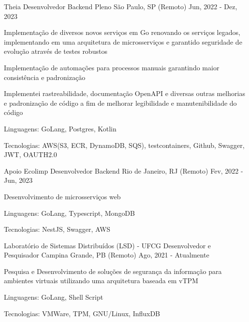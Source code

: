 
\begin{cventries}
  \cventry
  {Theia} %
  {Desenvolvedor Backend Pleno} %
  {São Paulo, SP (Remoto)} %
  {Jun, 2022 - Dez, 2023} %
  {
    \begin{cvitems} %
      \item {Implementação de diversos novos serviços em Go renovando os serviços legados, implementando em uma arquitetura de microsserviços e garantido seguridade de evolução através de testes robustos}
      \item {Implementação de automações para processos manuais garantindo maior consistência e padronização}
      \item {Implementei rastreabilidade, documentação OpenAPI e diversas outras melhorias e padronização de código a fim de melhorar legibilidade e manutenibilidade do código }
      \item {Linguagens: GoLang, Postgres, Kotlin}
      \item {Tecnologias: AWS(S3, ECR, DynamoDB, SQS), testcontainers, Github, Swagger, JWT, OAUTH2.0}
    \end{cvitems}
  }

  \cventry
  {Apoio Ecolimp} %
  {Desenvolvedor Backend} %
  {Rio de Janeiro, RJ (Remoto)} %
  {Fev, 2022 - Jun, 2023} %
  {
    \begin{cvitems} %
      \item {Desenvolvimento de microsserviços web}
      \item {Linguagens: GoLang, Typescript, MongoDB}
      \item {Tecnologias: NestJS, Swagger, AWS}
    \end{cvitems}
  }

  \cventry
  {Laboratório de Sistemas Distribuídos (LSD) - UFCG} %
  {Desenvolvedor e Pesquisador} %
  {Campina Grande, PB (Remoto)} %
  {Ago, 2021 - Atualmente} %
  {
    \begin{cvitems} %
      \item {Pesquisa e Desenvolvimento de soluções de segurança da informação para ambientes virtuais utilizando uma arquitetura baseada em vTPM}
      \item {Linguagens: GoLang, Shell Script}
      \item {Tecnologias: VMWare, TPM, GNU/Linux, InfluxDB}
    \end{cvitems}
  }


\end{cventries}

